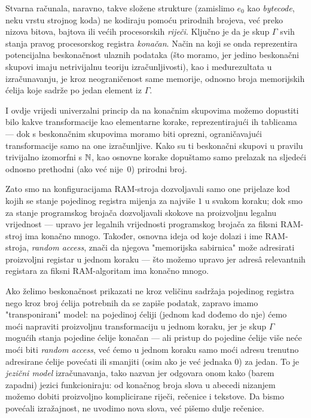 Stvarna računala, naravno, takve složene strukture (zamislimo $e_0$ kao \emph{bytecode}, neku vrstu strojnog koda) ne kodiraju pomoću prirodnih brojeva, već preko nizova bitova, bajtova ili većih procesorskih \emph{riječi}. Ključno je da je skup $\Gamma$ svih stanja pravog procesorskog registra \emph{konačan}. Način na koji se onda reprezentira potencijalna beskonačnost ulaznih podataka (što moramo, jer jedino beskonačni skupovi imaju netrivijalnu teoriju izračunljivosti), kao i međurezultata u izračunavanju, je kroz neograničenost same memorije, odnosno broja memorijskih ćelija koje sadrže po jedan element iz $\Gamma$.

I ovdje vrijedi univerzalni princip da na konačnim skupovima možemo dopustiti bilo kakve transformacije kao elementarne korake, reprezentirajući ih tablicama --- dok s beskonačnim skupovima moramo biti oprezni, ograničavajući transformacije samo na one izračunljive. Kako su ti beskonačni skupovi u pravilu trivijalno izomorfni s ${\mathbb N}$, kao osnovne korake dopuštamo samo prelazak na sljedeći odnosno prethodni (ako već nije~$0$) prirodni broj.

Zato smo na konfiguracijama RAM-stroja dozvoljavali samo one prijelaze kod kojih se stanje pojedinog registra mijenja za najviše $1$ u svakom koraku; dok smo za stanje programskog brojača dozvoljavali skokove na proizvoljnu legalnu vrijednost --- upravo jer legalnih vrijednosti programskog brojača za fiksni RAM-stroj ima konačno mnogo. Također, osnovna ideja od koje dolazi i ime RAM-stroja, \emph{random access}, znači da njegova "memorijska sabirnica" može adresirati proizvoljni registar u jednom koraku --- što možemo upravo jer adresâ relevantnih registara za fiksni RAM-algoritam ima konačno mnogo.

Ako želimo beskonačnost prikazati ne kroz veličinu sadržaja pojedinog registra nego kroz broj ćelija potrebnih da se zapiše podatak, zapravo imamo "transponirani" model: na pojedinoj ćeliji (jednom kad dođemo do nje) ćemo moći napraviti proizvoljnu transformaciju u jednom koraku, jer je skup $\Gamma$ mogućih stanja pojedine ćelije konačan --- ali pristup do pojedine ćelije više neće moći biti \emph{random access}, već ćemo u jednom koraku samo moći adresu trenutno adresirane ćelije povećati ili smanjiti (osim ako je već jednaka $0$) za jedan. To je \emph{jezični model} izračunavanja, tako nazvan jer odgovara onom kako (barem zapadni) jezici funkcioniraju: od konačnog broja slova u abecedi nizanjem možemo dobiti proizvoljno komplicirane riječi, rečenice i tekstove. Da bismo povećali izražajnost, ne uvodimo nova slova, već pišemo dulje rečenice.

